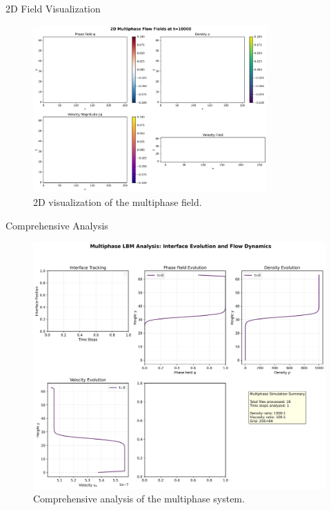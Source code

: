 \documentclass{beamer}
\begin{document}
\begin{frame}{2D Field Visualization}
  \begin{figure}
    \includegraphics[width=0.8\textwidth]{plots/multiphase/2d_field_visualization.png}
    \caption{2D visualization of the multiphase field.}
  \end{figure}
\end{frame}

\begin{frame}{Comprehensive Analysis}
  \begin{figure}
    \includegraphics[width=\textwidth]{plots/multiphase/comprehensive_analysis.png}
    \caption{Comprehensive analysis of the multiphase system.}
  \end{figure}
\end{frame}
\end{document}
